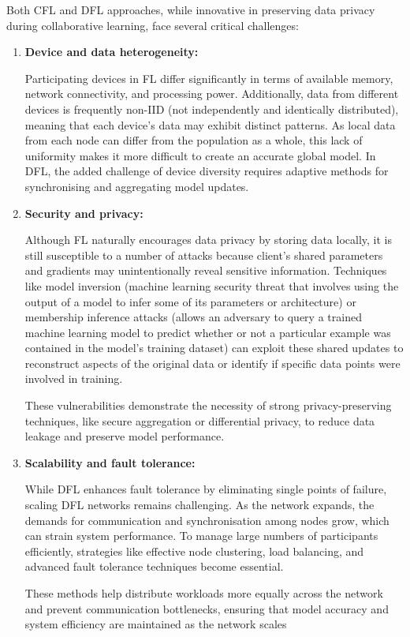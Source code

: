 Both CFL and DFL approaches, while innovative in preserving data privacy during collaborative learning, face several critical challenges:

\begin{enumerate}
	\item \textbf{Device and data heterogeneity:}
	
	Participating devices in \gls{FL} differ significantly in terms of available memory, network connectivity, and processing power. Additionally, data from different devices is frequently non-IID (not independently and identically distributed), meaning that each device's data may exhibit distinct patterns. As local data from each node can differ from the population as a whole, this lack of uniformity makes it more difficult to create an accurate global model. In \gls{DFL}, the added challenge of device diversity requires adaptive methods for synchronising and aggregating model updates. ​
	\item \textbf{Security and privacy:}
	
	Although FL naturally encourages data privacy by storing data locally, it is still susceptible to a number of attacks because client’s shared parameters and gradients may unintentionally reveal sensitive information. Techniques like model inversion (machine learning security threat that involves using the output of a model to infer some of its parameters or architecture) or membership inference attacks (allows an adversary to query a trained machine learning model to predict whether or not a particular example was contained in the model's training dataset) can exploit these shared updates to reconstruct aspects of the original data or identify if specific data points were involved in training. 
	
	These vulnerabilities demonstrate the necessity of strong privacy-preserving techniques, like secure aggregation or differential privacy, to reduce data leakage and preserve model performance.
	\item \textbf{Scalability and fault tolerance:} 
	
	While DFL enhances fault tolerance by eliminating single points of failure, scaling DFL networks remains challenging. As the network expands, the demands for communication and synchronisation among nodes grow, which can strain system performance. To manage large numbers of participants efficiently, strategies like effective node clustering, load balancing, and advanced fault tolerance techniques become essential. 
	
	These methods help distribute workloads more equally across the network and prevent communication bottlenecks, ensuring that model accuracy and system efficiency are maintained as the network scales

\end{enumerate}

